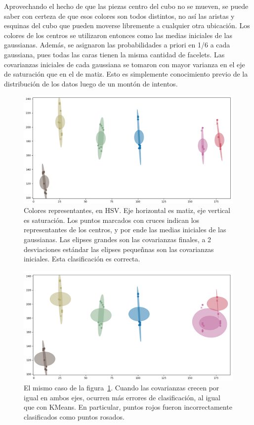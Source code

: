 Aprovechando el hecho de que las piezas centro del cubo no se mueven, se puede saber con certeza de que esos colores son todos distintos, no así las aristas y esquinas del cubo que pueden moverse libremente a cualquier otra ubicación. Los colores de los centros se utilizaron entonces como las medias iniciales de las gaussianas. Además, se asignaron las probabilidades a priori en 1/6 a cada gaussiana, pues todas las caras tienen la misma cantidad de facelets. Las covarianzas iniciales de cada gaussiana se tomaron con mayor varianza en el eje de saturación que en el de matiz. Esto es simplemente conocimiento previo de la distribución de los datos luego de un montón de intentos.

\begin{figure}[h!]
	\centering
	\includegraphics[width=\textwidth]{figures/gmm}
	\caption{Colores representantes, en HSV. Eje horizontal es matiz, eje vertical es saturación. Los puntos marcados con cruces indican los representantes de los centros, y por ende las medias iniciales de las gaussianas. Las elipses grandes son las covarianzas finales, a 2 desviaciones estándar las elipses pequeñnas son las covarianzas iniciales. Esta clasificación es correcta.}
	\label{gmmgood}
\end{figure}

\begin{figure}[h!]
	\centering
	\includegraphics[width=\textwidth]{figures/gmm_bad}
	\caption{El mismo caso de la figura~\ref{gmmgood}. Cuando las covarianzas crecen por igual en ambos ejes, ocurren más errores de clasificación, al igual que con KMeans. En particular, puntos rojos fueron incorrectamente clasificados como puntos rosados.}
	\label{gmmbad}
\end{figure}

